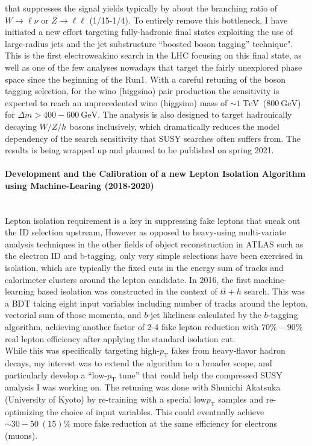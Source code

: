 \documentclass[12pt]{article}
\newcommand{\Subsubsection}[1]{\subsubsection*{#1}
\addcontentsline{toc}{subsubsection}{#1}}
\newcommand{\pt}{\ensuremath{p_{\text{T}}}\xspace}
\newcommand{\dm}{\ensuremath{\Delta m}\xspace}
\newcommand{\ra}{\rightarrow}
\newcommand{\GeV}{\text{GeV}\xspace}
\newcommand{\TeV}{\text{TeV}\xspace}
\begin{document}
that suppresses the signal yields typically by about the branching ratio of $W \ra \ell\nu$ or $Z \ra \ell\ell$ (1/15-1/4).
To entirely remove this bottleneck, I have initiated a new effort targeting fully-hadronic final states exploiting the use of large-radius jets and the jet substructure ``boosted boson tagging'' technique". %
This is the first electroweakino search in the LHC focusing on this final state, as well as one of the few analyses nowadays that target the fairly unexplored phase space since the beginning of the Run1.
With a careful retuning of the boson tagging selection, for the wino (higgsino) pair production the sensitivity is expected to reach an unprecedented wino (higgsino) mass of $\sim 1~\TeV$~($800~\GeV$) for $\dm>400-600~\GeV$.
The analysis is also designed to target hadronically decaying $W/Z/h$ bosons inclusively, which dramatically reduces the model dependency of the search sensitivity that SUSY searches often suffers from.
The results is being wrapped up and planned to be published on spring 2021.

\paragraph{Development and the Calibration of a new Lepton Isolation Algorithm using Machine-Learing (2018-2020)}  \phantom{k} \vspace{3mm} \\
Lepton isolation requirement is a key in suppressing fake leptons that sneak out the ID selection upstream,
However as opposed to heavy-using multi-variate analysis techniques in the other fields of object reconstruction in ATLAS such as the electron ID and b-tagging,
only very simple selections have been exercised in isolation, which are typically the fixed cuts in the energy sum of tracks and calorimeter clusters around the lepton candidate.
In 2016, the first machine-learning based isolation was constructed in the context of $t\bar{t}+h$ search. This was a BDT taking eight input variables including number of tracks around the lepton, vectorial sum of those momenta, and $b$-jet likeliness calculated by the $b$-tagging algorithm, 
achieving another factor of 2-4 fake lepton reduction with $70\%-90\%$ real lepton efficiency after applying the standard isolation cut. \\

While this was specifically targeting high-\pt fakes from heavy-flavor hadron decays,
my interest was to extend the algorithm to a broader scope, and particularly develop a ``low-\pt tune'' that could help the compressed SUSY analysis I was working on.
The retuning was done with Shunichi Akatsuka (University of Kyoto) by re-training with a special low\pt samples and re-optimizing the choice of input variables.
This could eventually achieve $\sim 30-50~(15)\%$ more fake reduction at the same efficiency for electrons (muons). \\
\end{document}
